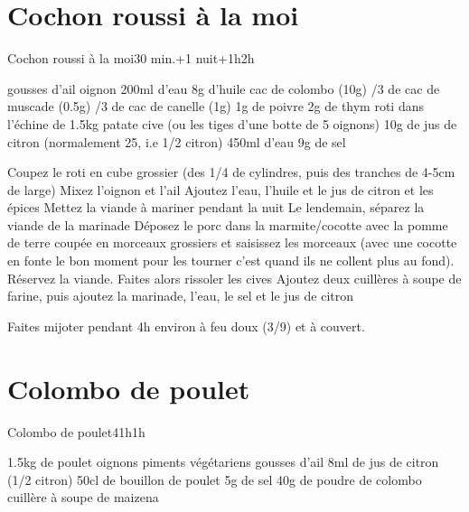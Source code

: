 {\section{Cochon roussi à la moi}
\begin{recette}{Cochon roussi à la moi}{}{30 min.+1 nuit+1h}{2h}
\begin{ingredients}
\ingredient[Marinade]
 gousses d'ail
 oignon
\ingredient 200ml d'eau
\ingredient 8g d'huile
 cac de colombo (10g)
/3 de cac de muscade (0.5g)
/3 de cac de canelle (1g)
\ingredient 1g de poivre
\ingredient 2g de thym
\ingredient[cuisson]
 roti dans l'échine de 1.5kg
 patate
 cive (ou les tiges d'une botte de 5 oignons)
\ingredient 10g de jus de citron (normalement 25, i.e 1/2 citron)
\ingredient 450ml d'eau
\ingredient 9g de sel
\end{ingredients}

\begin{preparation}
\etape Coupez le roti en cube grossier (des 1/4 de cylindres, puis des tranches de 4-5cm de large)
\etape Mixez l'oignon et l'ail
\etape Ajoutez l'eau, l'huile et le jus de citron et les épices
\etape Mettez la viande à mariner pendant la nuit
\etape Le lendemain, séparez la viande de la marinade
\etape Déposez le porc dans la marmite/cocotte avec la pomme de terre coupée en morceaux grossiers et saisissez les morceaux (avec une cocotte en fonte le bon moment pour les tourner c'est quand ils ne collent plus au fond).
\etape Réservez la viande. Faites alors rissoler les cives
\etape Ajoutez deux cuillères à soupe de farine, puis ajoutez la marinade, l'eau, le sel et le jus de citron
\end{preparation}

\begin{cuisson}
Faites mijoter pendant 4h environ à feu doux (3/9) et à couvert.
\end{cuisson}
\end{recette}

\section{Colombo de poulet}
\begin{recette}{Colombo de poulet}{4}{1h}{1h}
\begin{ingredients}
\ingredient 1.5kg de poulet
 oignons
 piments végétariens
 gousses d'ail
\ingredient 8ml de jus de citron (1/2 citron)
\ingredient 50cl de bouillon de poulet
\ingredient 5g de sel
\ingredient 40g de poudre de colombo
 cuillère à soupe de maizena
\end{ingredients}



\end{recette}}
